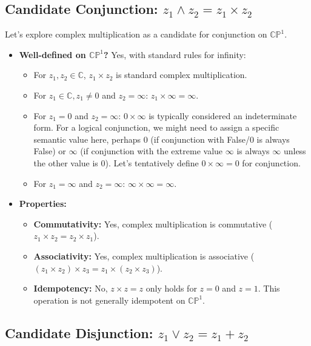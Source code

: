 \documentclass{article}
\begin{document}
	\subsection{Candidate Conjunction: $z_1 \wedge z_2 = z_1 \times z_2$}
	
	Let's explore complex multiplication as a candidate for conjunction on $\mathbb{CP}^1$.
	
	\begin{itemize}
		\item \textbf{Well-defined on $\mathbb{CP}^1$?} Yes, with standard rules for infinity:
		\begin{itemize}
			\item For $z_1, z_2 \in \mathbb{C}$, $z_1 \times z_2$ is standard complex multiplication.
			\item For $z_1 \in \mathbb{C}, z_1 \neq 0$ and $z_2 = \infty$: $z_1 \times \infty = \infty$.
			\item For $z_1 = 0$ and $z_2 = \infty$: $0 \times \infty$ is typically considered an indeterminate form. For a logical conjunction, we might need to assign a specific semantic value here, perhaps 0 (if conjunction with False/0 is always False) or $\infty$ (if conjunction with the extreme value $\infty$ is always $\infty$ unless the other value is 0). Let's tentatively define $0 \times \infty = 0$ for conjunction.
			\item For $z_1 = \infty$ and $z_2 = \infty$: $\infty \times \infty = \infty$.
		\end{itemize}
		
		\item \textbf{Properties:}
		\begin{itemize}
			\item \textbf{Commutativity:} Yes, complex multiplication is commutative ($z_1 \times z_2 = z_2 \times z_1$).
			\item \textbf{Associativity:} Yes, complex multiplication is associative ($(z_1 \times z_2) \times z_3 = z_1 \times (z_2 \times z_3)$).
			\item \textbf{Idempotency:} No, $z \times z = z$ only holds for $z = 0$ and $z = 1$. This operation is not generally idempotent on $\mathbb{CP}^1$.
		\end{itemize}
	\end{itemize}
	
	\subsection{Candidate Disjunction: $z_1 \vee z_2 = z_1 + z_2$}
	
\end{document}
